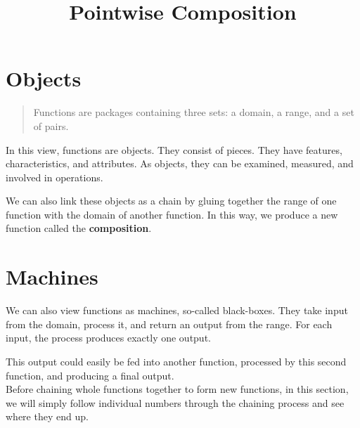 \documentclass{ximera}
\title{Pointwise Composition}
\begin{document}
\begin{abstract}
\end{abstract}
\maketitle



\section{Objects}


\begin{quote}
Functions are packages containing three sets: a domain, a range, and a set of pairs.
\end{quote}

In this view, functions are objects.  They consist of pieces. They have features, characteristics, and attributes.  As objects, they can be examined, measured, and involved in operations.


We can also link these objects as a chain by gluing together the range of one function with the domain of another function.  In this way, we produce a new function called the \textbf{composition}.












\section{Machines}



We can also view functions as machines, so-called black-boxes.  They take input from the domain, process it, and return an output from the range.  For each input, the process produces exactly one output.



This output could easily be fed into another function, processed by this second function, and producing a final output. \\



Before chaining whole functions together to form new functions, in this section, we will simply follow individual numbers through the chaining process and see where they end up.
\end{document}
